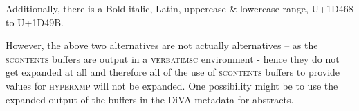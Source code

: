 Additionally, there is a  Bold italic, Latin, uppercase \& lowercase range, \ie U+1D468 to U+1D49B.

However, the above two alternatives are not actually alternatives -- as the \textsc{scontents} buffers are output in a \textsc{verbatimsc} environment - hence they do not get expanded at all and therefore all of the use of \textsc{scontents} buffers to provide values for \textsc{hyperxmp} will not be expanded. One possibility might be to use the expanded output of the buffers in the DiVA metadata for abstracts.

%
